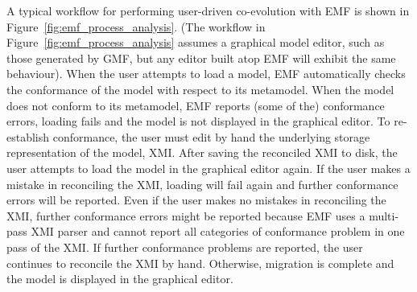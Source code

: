 A typical workflow for performing user-driven co-evolution with EMF is shown in Figure~\ref{fig:emf_process_analysis}. (The workflow in Figure~\ref{fig:emf_process_analysis} assumes a graphical model editor, such as those generated by GMF, but any editor built atop EMF will exhibit the same behaviour). When the user attempts to load a model, EMF automatically checks the conformance of the model with respect to its metamodel. When the model does not conform to its metamodel, EMF reports (some of the) conformance errors, loading fails and the model is not displayed in the graphical editor. To re-establish conformance, the user must edit by hand the underlying storage representation of the model, XMI. After saving the reconciled XMI to disk, the user attempts to load the model in the graphical editor again. If the user makes a mistake in reconciling the XMI, loading will fail again and further conformance errors will be reported. Even if the user makes no mistakes in reconciling the XMI, further conformance errors might be reported because EMF uses a multi-pass XMI parser and cannot report all categories of conformance problem in one pass of the XMI. If further conformance problems are reported, the user continues to reconcile the XMI by hand. Otherwise, migration is complete and the model is displayed in the graphical editor. 

